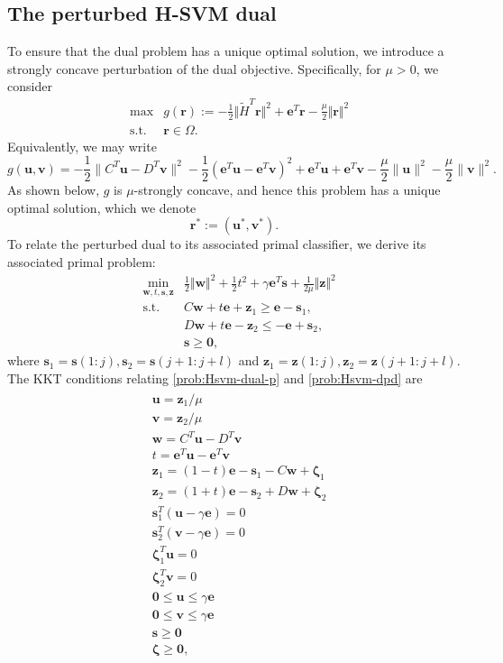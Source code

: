 \documentclass[twoside,11pt]{article}
\newcommand\bz{\bm{0}}
\newcommand{\bzeta}{\bm{\zeta}}
\renewcommand\r{\bm{r}}
\newcommand\s{\bm{s}}
\renewcommand\u{\bm{u}}
\renewcommand\v{\bm{v}}
\newcommand\w{\bm{w}}
\newcommand\z{\bm{z}}
\newcommand\e{\bm{e}}
\newcommand\tH{\tilde{H}}
\begin{document}
\subsection{The perturbed H-SVM dual} \label{sec:Hsvm-p-dual}
To ensure that the dual problem has a unique optimal solution, we introduce a strongly concave perturbation of the dual objective. Specifically, for $\mu > 0$, we consider
\begin{equation} \label{prob:Hsvm-dual-p}
  \begin{array}{rrl}
    &\max&g(\r):=-\frac{1}{2}\Vert \tH^T\r\Vert^2 + \e^T\r - \frac{\mu}{2}\Vert\r\Vert^2\\
    &\mbox{s.t.}&\r\in \Omega.
  \end{array}
\end{equation}
Equivalently, we may write
\[
    g(\u,\v) = -\frac{1}{2}\|C^T\u - D^T\v\|^2 - \frac{1}{2}(\e^T\u - \e^T\v)^2 + \e^T\u + \e^T\v - \frac{\mu}{2}\|\u\|^2 - \frac{\mu}{2}\|\v\|^2.
\]
As shown below, $g$ is $\mu$-strongly concave, and hence this problem has a unique optimal solution, which we denote
\[
    \r^* := (\u^*,\v^*).
\]
To relate the perturbed dual to its associated primal classifier, we derive its associated primal problem:
\begin{equation} \label{prob:Hsvm-dpd}
  \begin{array}{rrl}
    &\min_{\w,t,\s,\z} & \frac{1}{2}\Vert\w\Vert^2 + \frac{1}{2}t^2 + \gamma\e^T\s + \frac{1}{2\mu}\Vert\z\Vert^2\\
    &\mbox{s.t.}& C\w+t\e+\z_1\ge \e-\s_1,\\
    &&D\w+t\e -\z_2\le -\e+\s_2,\\
    &&\s \geq \bz,
  \end{array}
\end{equation}
where $\s_1 = \s(1:j), \s_2 = \s(j+1:j+l)$ and $\z_1 = \z(1:j), \z_2 = \z(j+1:j+l)$.
The KKT conditions relating \eqref{prob:Hsvm-dual-p} and \eqref{prob:Hsvm-dpd} are
\begin{align}
  \begin{split} \label{eqn:Hsvm-kkt}
    &\u = \z_1/\mu\\
    &\v = \z_2/\mu\\
    &\w = C^T\u - D^T\v\\
    &t = \e^T\u - \e^T\v\\
    &\z_1 = (1-t)\e - \s_1 - C\w + \bzeta_1\\
    &\z_2 = (1+t)\e - \s_2 + D\w + \bzeta_2\\
    &\s_1^T(\u - \gamma\e) = 0\\
    &\s_2^T(\v - \gamma\e) = 0\\
    &\bzeta_1^T\u = 0\\
    &\bzeta_2^T\v = 0\\
    &\bz \leq \u \leq \gamma\e\\
    &\bz \leq \v \leq \gamma\e\\
    &\s \geq \bz\\
    &\bzeta \geq \bz,
  \end{split}
\end{align}
\end{document}
